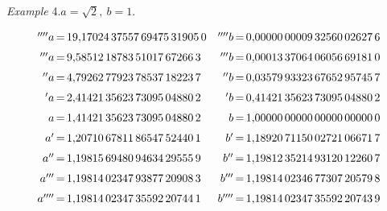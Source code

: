 \begin{center}\textit{Example} 4.\quad $a=\surd 2,\ b=1$.\end{center}
\begingroup\small\setlength{\arraycolsep}{0pt}
\[\begin{array}{r@{\,=\,}l@{\quad}r@{\,=\,}l}
{}^{\prime\prime\prime\prime}a&19{,}17024\,37557\,69475\,31905\,0&{}^{\prime\prime\prime\prime}b&0{,}00000\,00009\,32560\,02627\,6\\[6pt]
{}^{\prime\prime\prime}a&9{,}58512\,18783\,51017\,67266\,3&{}^{\prime\prime\prime}b&0{,}00013\,37064\,06056\,69181\,0\\[6pt]
{}^{\prime\prime}a&4{,}79262\,77923\,78537\,18223\,7&{}^{\prime\prime}b&0{,}03579\,93323\,67652\,95745\,7\\[6pt]
{}^{\prime}a&2{,}41421\,35623\,73095\,04880\,2&{}^{\prime}b&0{,}41421\,35623\,73095\,04880\,2\\[6pt]
a&1{,}41421\,35623\,73095\,04880\,2&b&1{,}00000\,00000\,00000\,00000\,0\\[6pt]
a'&1{,}20710\,67811\,86547\,52440\,1&b'&1{,}18920\,71150\,02721\,06671\,7\\[6pt]
a''&1{,}19815\,69480\,94634\,29555\,9&b''&1{,}19812\,35214\,93120\,12260\,7\\[6pt]
a'''&1{,}19814\,02347\,93877\,20908\,3&b'''&1{,}19814\,02346\,77307\,20579\,8\\[6pt]
a''''&1{,}19814\,02347\,35592\,20744\,1&b''''&1{,}19814\,02347\,35592\,20743\,9
\end{array}
\]\endgroup


